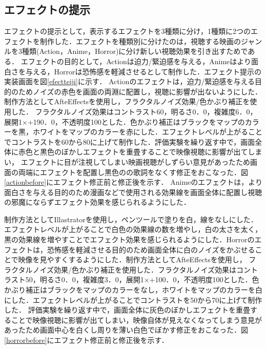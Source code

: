 \subsection{エフェクトの提示}
エフェクトの提示として，表示するエフェクトを3種類に分け，1種類に2つのエフェクトを制作した．エフェクトを種類別に分けたのは，視聴する映画のジャンルを3種類(Action，Anime，Horror)に分け新しい視聴効果を引き出すためである．
エフェクトの目的として，Actionは迫力/緊迫感を与える，Animeはより面白さを与える，Horrorは恐怖感を軽減させるとして制作した．エフェクト提示の実装画面を図\ref{efectteiji}に示す．
Actionのエフェクトは，迫力/緊迫感を与える目的のためノイズの赤色を画面の両淵に配置し，視聴に影響が出ないようにした．制作方法としてAfteEffectsを使用し，フラクタルノイズ効果/色かぶり補正を使用した．
フラクタルノイズ効果はコントラスト60，明るさ0．0，複雑度6．0，展開1×+190．0，不透明度100とした．色かぶり補正はブラックをマップのカラーを黒，ホワイトをマップのカラーを赤にした．エフェクトレベルが上がることでコントラストを60から80に上げて制作した．評価実験を繰り返す中で，画面全体に赤色と黒色のぼかしエフェクトを重畳することで映像視聴に影響が出てしまい，
エフェクトに目が注視してしまい映画視聴がしずらい意見があったため画面の両端にエフェクトを配置し黒色のの歌詞をなくす修正をおこなった．図\ref{actionbefore}にエフェクト修正前と修正後を示す．
Animeのエフェクトは，より面白さを与える目的のため漫画などで使用される効果線を画面全体に配置し視聴の邪魔にならずエフェクト効果を感じられるようにした．
 
制作方法としてIllastratorを使用し，ペンツールで塗りを白，線をなしにした．エフェクトレベルが上がることで白色の効果線の数を増やし，白の太さを太く，黒の効果線を増やすことでエフェクト効果を感じられるようにした．Horrorのエフェクトは，恐怖感を軽減させる目的のため画面全体に白のノイズをかぶせることで映像を見やすくするようにした．制作方法としてAfteEffectsを使用し，
フラクタルノイズ効果/色かぶり補正を使用した．フラクタルノイズ効果はコントラスト50，明るさ0．0，複雑度3．0，展開1×+100．0，不透明度100とした．色かぶり補正はブラックをマップのカラーをなし，ホワイトをマップのカラーを白にした．エフェクトレベルが上がることでコントラストを50から70に上げて制作した．
評価実験を繰り返す中で，画面全体に灰色のぼかしエフェクトを重畳することで映像視聴に影響が出てしまい，映像自体が見えなくなってしまう意見があったため画面中心を白くし周りを薄い白色でぼかす修正をおこなった．図\ref{horrorbefore}にエフェクト修正前と修正後を示す．
 
